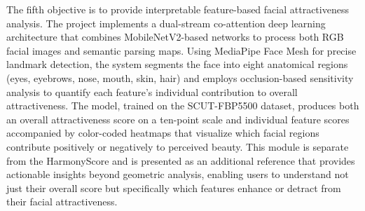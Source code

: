 The fifth objective is to provide interpretable feature-based facial attractiveness analysis. The project implements a dual-stream co-attention deep learning architecture that combines MobileNetV2-based networks to process both RGB facial images and semantic parsing maps. Using MediaPipe Face Mesh for precise landmark detection, the system segments the face into eight anatomical regions (eyes, eyebrows, nose, mouth, skin, hair) and employs occlusion-based sensitivity analysis to quantify each feature's individual contribution to overall attractiveness. The model, trained on the SCUT-FBP5500 dataset, produces both an overall attractiveness score on a ten-point scale and individual feature scores accompanied by color-coded heatmaps that visualize which facial regions contribute positively or negatively to perceived beauty. This module is separate from the HarmonyScore and is presented as an additional reference that provides actionable insights beyond geometric analysis, enabling users to understand not just their overall score but specifically which features enhance or detract from their facial attractiveness.
